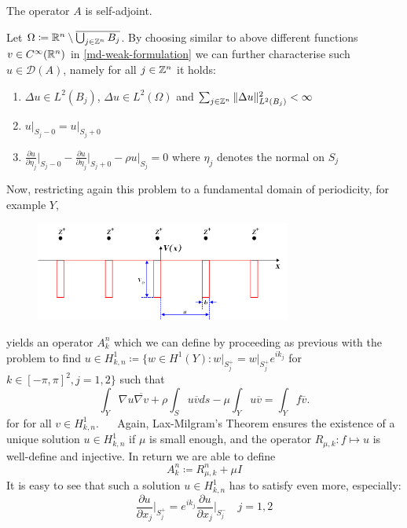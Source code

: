 \begin{remark}
	The operator $A$ is self-adjoint.	
\end{remark}


\begin{theorem} Let $\Omega \coloneqq \mathbb{R}^{n} \setminus \overline{\bigcup_{j \in \mathbb{Z}^{n}} B_{j}}$. By choosing similar to above different functions $v \in C^{\infty}(\mathbb{R}^{n})$ in \eqref{md-weak-formulation} we can further characterise such $u \in \mathcal{D}(A)$, namely for all $j \in \mathbb{Z}^{n}$ it holds:
	\begin{enumerate}
		\item $\Delta u \in L^{2}(B_{j})$, $\Delta u \in L^{2}(\Omega)$ and $\sum_{j \in \mathbb{Z}^{n}} \|\Delta u \|_{L^{2}(B_{j})}^{2} < \infty$
		\item $u \big|_{S_{j} - 0} = u \big|_{S_{j} + 0}$
		\item $\frac{\partial u}{\partial \eta_{j}} \big|_{S_{j} - 0} - \frac{\partial u}{\partial \eta_{j}} \big|_{S_{j} + 0} - \rho u \big|_{S_{j}} = 0$ where $\eta_{j}$ denotes the normal on $S_{j}$
	\end{enumerate}
\end{theorem}

Now, restricting again this problem to a fundamental domain of periodicity, for example $Y$,
\begin{figure}[h!] \centering
	  \includegraphics[width=0.75\textwidth]{Periodic_square_potential_130707} 
\end{figure}

yields an operator $A^{n}_{k}$ which we can define by proceeding as previous with the problem to find $u \in H^{1}_{k, n} \coloneqq \big\{ w \in H^{1}(Y) \colon w \big|_{S_{j}^{+}} = w \big|_{S_{j}^{+}} e^{i k_{j}}$ for $k \in [-\pi, \pi]^{2}, j = 1,2 \big\}$ such that
	\begin{equation}
		\int_{Y} \nabla u \overline{\nabla v} + \rho \int_{S} u \overline{v} ds - \mu \int_{Y} u \overline{v} = \int_{Y} f \overline{v}. \label{md-weak-formulation-res}
	\end{equation} 
for for all $v \in H^{1}_{k, n}$.
~\newline ~\newline
Again, Lax-Milgram's Theorem ensures the existence of a unique solution $u \in H^{1}_{k, n}$ if $\mu$ is small enough, and the operator $R_{\mu, k} \colon f \mapsto u$ is well-define and injective. In return we are able to define 
	\[ A_{k}^{n} \coloneqq R_{\mu, k}^{n} + \mu I \]
It is easy to see that such a solution $u \in H^{1}_{k, n}$ has to satisfy even more, especially:
	\[ \frac{\partial u}{\partial x_{j}}\big|_{S_{j}^{+}} = e^{ik_{j}} \frac{\partial u}{\partial x_{j}}\big|_{S_{j}^{-}} \quad j = 1,2  \]
	
